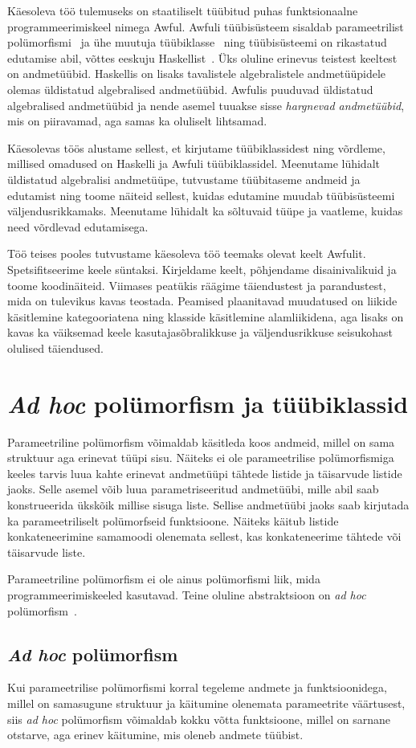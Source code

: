 \documentclass[12pt]{article}
\newcommand\peatykk[1]{
  \clearpage
  \section{#1}}
\begin{document}
    Käesoleva töö tulemuseks on staatiliselt tüübitud puhas funktsionaalne programmeerimiskeel nimega Awful. Awfuli tüübisüsteem sisaldab parameetrilist polümorfismi~\cite{Fun} ja ühe muutuja tüübiklasse~\cite{How} ning tüübisüsteemi on rikastatud edutamise abil, võttes eeskuju Haskellist~\cite{Giv}. Üks oluline erinevus teistest keeltest on andmetüübid. Haskellis on lisaks tavalistele algebralistele andmetüüpidele olemas üldistatud algebralised andmetüübid. Awfulis puuduvad üldistatud algebralised andmetüübid ja nende asemel tuuakse sisse \textit{hargnevad andmetüübid}, mis on piiravamad, aga samas ka oluliselt lihtsamad.

    Käesolevas töös alustame sellest, et kirjutame tüübiklassidest ning võrdleme, millised omadused on Haskelli ja Awfuli tüübiklassidel. Meenutame lühidalt üldistatud algebralisi andmetüüpe, tutvustame tüübitaseme andmeid ja edutamist ning toome näiteid sellest, kuidas edutamine muudab tüübisüsteemi väljendusrikkamaks. Meenutame lühidalt ka sõltuvaid tüüpe ja vaatleme, kuidas need võrdlevad edutamisega.

    Töö teises pooles tutvustame käesoleva töö teemaks olevat keelt Awfulit. Spetsifitseerime keele süntaksi. Kirjeldame keelt, põhjendame disainivalikuid ja toome koodinäiteid. Viimases peatükis räägime täiendustest ja parandustest, mida on tulevikus kavas teostada. Peamised plaanitavad muudatused on liikide käsitlemine kategooriatena ning klasside käsitlemine alamliikidena, aga lisaks on kavas ka väiksemad keele kasutajasõbralikkuse ja väljendusrikkuse seisukohast olulised täiendused.
  \peatykk{\textit{Ad hoc} polümorfism ja tüübiklassid}
    Parameetriline polümorfism võimaldab käsitleda koos andmeid, millel on sama struktuur aga erinevat tüüpi sisu. Näiteks ei ole parameetrilise polümorfismiga keeles tarvis luua kahte erinevat andmetüüpi tähtede listide ja täisarvude listide jaoks. Selle asemel võib luua parametriseeritud andmetüübi, mille abil saab konstrueerida ükskõik millise sisuga liste. Sellise andmetüübi jaoks saab kirjutada ka parameetriliselt polümorfseid funktsioone. Näiteks käitub listide konkateneerimine samamoodi olenemata sellest, kas konkateneerime tähtede või täisarvude liste.

    Parameetriline polümorfism ei ole ainus polümorfismi liik, mida programmeerimiskeeled kasutavad. Teine oluline abstraktsioon on \textit{ad hoc} polümorfism~\cite{Fun}.
    \subsection{\textit{Ad hoc} polümorfism}\label{peidetudargumendid}
      Kui parameetrilise polümorfismi korral tegeleme andmete ja funktsioonidega, millel on samasugune struktuur ja käitumine olenemata parameetrite väärtusest, siis \textit{ad hoc} polümorfism võimaldab kokku võtta funktsioone, millel on sarnane otstarve, aga erinev käitumine, mis oleneb andmete tüübist.
\end{document}
